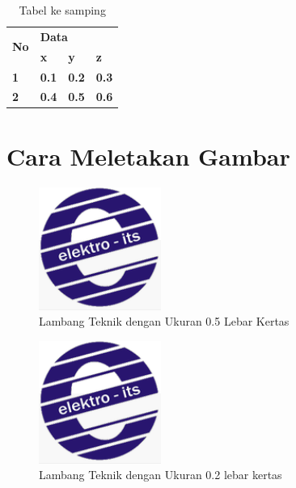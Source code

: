 \begin{table}
	\centering
	\caption{Tabel ke samping}
	\begin{tabular}{|l|l|l|l|}
		\hline
		\multirow{2}{*}{\textbf{No}} & \multicolumn{3}{l|}{\textbf{Data}} \\ \cline{2-4} 
		& \textbf{x} & \textbf{y} & \textbf{z} \\ \hline
		\textbf{1} & \textbf{0.1} & \textbf{0.2} & \textbf{0.3} \\ \hline
		\textbf{2} & \textbf{0.4} & \textbf{0.5} & \textbf{0.6} \\ \hline
	\end{tabular}
	
\end{table}
\newpage
\section{Cara Meletakan Gambar}
\begin{figure}[H]
	\centering
	\includegraphics[width=0.5\linewidth]{bab2/LambangTeknikElektro}
	\caption{Lambang Teknik dengan Ukuran 0.5 Lebar Kertas}
	\label{fig:lambangteknikelektro}
\end{figure}
\begin{figure}[H]
	\centering
	\includegraphics[width=0.2\linewidth]{bab2/LambangTeknikElektro}
	\caption{Lambang Teknik dengan Ukuran 0.2 lebar kertas}
	\label{fig:lambangteknikelektro2}
\end{figure}
